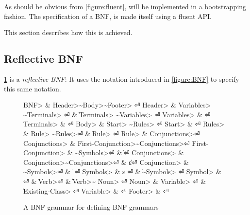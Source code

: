 As should be obvious from \cref{figure:fluent}, \Fajita will be implemented
in a bootstrapping fashion.
The specification of a BNF, is made itself using a fluent API.

This section describes how this is achieved.

\subsection{Reflective BNF}
\cref{figure:BNF:BNF} is a \emph{reflective BNF}:
It uses the notation introduced in \cref{figure:BNF}
to specify this same notation.

\begin{figure}
  \begin{Grammar}
    \begin{aligned}
      \<BNF>                & \Derives \<Header>\~\<Body>\~\<Footer> \hfill⏎
      \<Header>             & \Derives \<Variables> \~\<Terminals> \hfill⏎
      {}                    & \| \<Terminals> \~\<Variables> \hfill⏎
      \<Variables>          & \Derives {}\hfill⏎
      \<Terminals>          & \Derives {}\hfill⏎
      \<Body>               & \Derives \<Start> \~\<Rules> \hfill⏎
      \<Start>              & \Derives {} \hfill⏎
      \<Rules>              & \Derives \<Rule> \~\<Rules>\hfill⏎
      {}                    & \| \<Rule> \hfill⏎
      \<Rule>               & \Derives {} \<Conjunctions>\hfill⏎
      \<Conjunctions>       & \Derives \<First-Conjunction>\~\<Conjunctions>\hfill⏎
      \<First-Conjunction>  & \Derives {}\~\<Symbols>\hfill⏎
      {}                    & \| \hfill⏎
      \<Conjunctions> & \Derives \<Conjunction>\~\<Conjunctions>\hfill⏎
      {}                    & \| ε\hfill⏎
      \<Conjunction>  & \Derives {}\~\<Symbols>\hfill⏎
      {}                    & \|  \hfill⏎
      \<Symbols>    & \Derives ε \hfill⏎
      {}                    & \| \~\<Symbols> \hfill⏎
      \<Symbol>             & \Derives {} \hfill⏎
      {}                    & \| \<Verb>\hfill⏎
      {}                    & \| \<Verb>\~\cc{,} \<Noun> \hfill⏎
      \<Noun>               & \Derives \<Variable> \hfill⏎
      {}                    & \| \<Existing-Class> \hfill⏎
      \<Variable>           & \Derives {} \hfill⏎
      \<Footer>             & \Derives {}\hfill⏎
    \end{aligned}
  \end{Grammar}
  \caption{A BNF grammar for defining BNF grammars}
  \label{figure:BNF:BNF}
\end{figure}
\begin{comment}
Note that this specification can only be approximate;
the figure uses verbs as replacement to indentation,
and special symbols such as~$|$,~$::-$ and~$ε$.
\end{comment}

